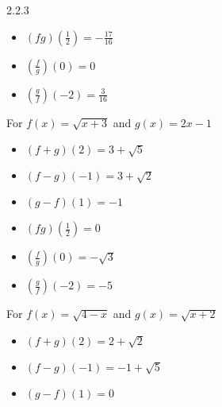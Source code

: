 \begin{Answer}{2.2.3}
\begin{multicols}{3}
\begin{itemize}
			\item  $(fg)\left(\frac{1}{2}\right) = -\frac{17}{16}$
			\item  $\left(\frac{f}{g}\right)(0) = 0$
			\item  $\left(\frac{g}{f}\right)\left(-2\right) = \frac{3}{16}$

		\end{itemize}
	\end{multicols}

	\item For $f(x) = \sqrt{x+3}$ and  $g(x) = 2x-1$

	\begin{multicols}{3}
		\begin{itemize}

			\item  $(f+g)(2) = 3+\sqrt{5}$
			\item  $(f-g)(-1) = 3+\sqrt{2}$
			\item  $(g-f)(1) = -1$

		\end{itemize}
	\end{multicols}

	\begin{multicols}{3}
		\begin{itemize}

			\item  $(fg)\left(\frac{1}{2}\right) = 0$
			\item  $\left(\frac{f}{g}\right)(0) = -\sqrt{3}$
			\item  $\left(\frac{g}{f}\right)\left(-2\right) = -5$

		\end{itemize}
	\end{multicols}

	\item For $f(x) = \sqrt{4-x}$ and $g(x) = \sqrt{x+2}$

	\begin{multicols}{3}
		\begin{itemize}

			\item  $(f+g)(2) = 2+\sqrt{2}$
			\item  $(f-g)(-1) = -1+\sqrt{5}$
			\item  $(g-f)(1) = 0$

		\end{itemize}
	\end{multicols}

	\begin{multicols}{3}
		\begin{itemize}


\end{itemize}
\end{multicols}
\end{Answer}
